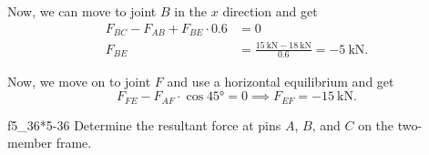 \begin{derivation}
  Now, we can move to joint $B$ in the $x$ direction and get
  \begin{align*}
    F_{BC} - F_{AB} + F_{BE} \cdot \num{0,6} &= 0 \\
    F_{BE} &= \frac{\qty{15}{\kN} - \qty{18}{\kN}}{\num{0.6} } = - \qty{5}{\kN}
  .\end{align*}

  Now, we move on to joint $F$ and use a horizontal equilibrium and get
  \begin{equation*}
    F_{FE} - F_{AF} \cdot \cos \ang{45} = 0 \implies F_{EF} = - \qty{15}{\kN} 
  .\end{equation*}
\end{derivation}


\begin{problemwithimage}{f5_36}{*5-36}
  Determine the resultant force at pins $A$, $B$, and $C$ on the two-member frame.
\end{problemwithimage}

